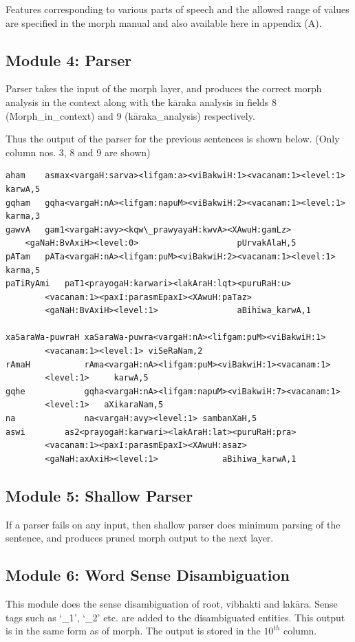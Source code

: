 \documentclass{llncs}
\begin{document}
\noindent 
Features corresponding to various parts of speech and the allowed range of values are specified in the morph manual and also available here in appendix (A).\\

\subsection{Module 4: Parser}
Parser takes the input of the morph layer, and produces the correct morph analysis in the context along with the k\={a}raka analysis in fields 8 (Morph\_in\_context) and 9 (k\={a}raka\_analysis) respectively.

\noindent 
Thus the output of the parser for the previous sentences is shown below.
(Only column nos. 3, 8 and 9 are shown)

\begin{verbatim}
aham	asmax<vargaH:sarva><lifgam:a><viBakwiH:1><vacanam:1><level:1>   karwA,5
gqham	gqha<vargaH:nA><lifgam:napuM><viBakwiH:2><vacanam:1><level:1>   karma,3
gawvA	gam1<vargaH:avy><kqw\_prawyayaH:kwvA><XAwuH:gamLz>
	<gaNaH:BvAxiH><level:0>					   pUrvakAlaH,5
pATam	pATa<vargaH:nA><lifgam:puM><viBakwiH:2><vacanam:1><level:1>     karma,5
paTiRyAmi	paT1<prayogaH:karwari><lakAraH:lqt><puruRaH:u>
		<vacanam:1><paxI:parasmEpaxI><XAwuH:paTaz>
		<gaNaH:BvAxiH><level:1> 		       aBihiwa_karwA,1

xaSaraWa-puwraH	xaSaraWa-puwra<vargaH:nA><lifgam:puM><viBakwiH:1>
		<vacanam:1><level:1> viSeRaNam,2
rAmaH           rAma<vargaH:nA><lifgam:puM><viBakwiH:1><vacanam:1>
		<level:1>     karwA,5
gqhe            gqha<vargaH:nA><lifgam:napuM><viBakwiH:7><vacanam:1>
		<level:1>   aXikaraNam,5
na              na<vargaH:avy><level:1> sambanXaH,5
aswi		as2<prayogaH:karwari><lakAraH:lat><puruRaH:pra>
		<vacanam:1><paxI:parasmEpaxI><XAwuH:asaz>
		<gaNaH:axAxiH><level:1>				aBihiwa_karwA,1
\end{verbatim}

\subsection{Module 5: Shallow Parser}
If a parser fails on any input, then shallow parser does minimum parsing of the sentence, and produces pruned morph output to the next layer.

\subsection{Module 6: Word Sense Disambiguation}
This module does the sense disambiguation of root, vibhakti and lak\={a}ra. Sense tags such as `\_1', `\_2' etc. are added to the disambiguated entities. This output is in the same form as of morph. The output is stored in the $10^{th}$ column.
\end{document}
